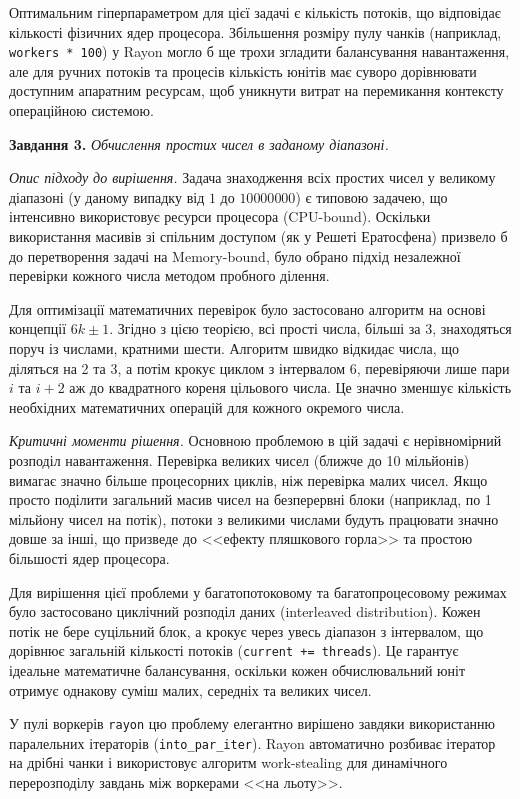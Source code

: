 \documentclass[14pt, a4paper]{extreport}
\begin{document}
	Оптимальним гіперпараметром для цієї задачі є кількість потоків, що відповідає кількості фізичних ядер процесора. Збільшення розміру пулу чанків (наприклад, \texttt{workers * 100}) у Rayon могло б ще трохи згладити балансування навантаження, але для ручних потоків та процесів кількість юнітів має суворо дорівнювати доступним апаратним ресурсам, щоб уникнути витрат на перемикання контексту операційною системою.
	
	\textbf{Завдання 3.} \textit{Обчислення простих чисел в заданому діапазоні.}
	
	\textit{Опис підходу до вирішення.}
	Задача знаходження всіх простих чисел у великому діапазоні (у даному випадку від $1$ до $10 000 000$) є типовою задачею, що інтенсивно використовує ресурси процесора (CPU-bound). Оскільки використання масивів зі спільним доступом (як у Решеті Ератосфена) призвело б до перетворення задачі на Memory-bound, було обрано підхід незалежної перевірки кожного числа методом пробного ділення. 
	
	Для оптимізації математичних перевірок було застосовано алгоритм на основі концепції $6k \pm 1$. Згідно з цією теорією, всі прості числа, більші за 3, знаходяться поруч із числами, кратними шести. Алгоритм швидко відкидає числа, що діляться на 2 та 3, а потім крокує циклом з інтервалом 6, перевіряючи лише пари $i$ та $i+2$ аж до квадратного кореня цільового числа. Це значно зменшує кількість необхідних математичних операцій для кожного окремого числа. 
	
	\textit{Критичні моменти рішення.}
	Основною проблемою в цій задачі є нерівномірний розподіл навантаження. Перевірка великих чисел (ближче до 10 мільйонів) вимагає значно більше процесорних циклів, ніж перевірка малих чисел. Якщо просто поділити загальний масив чисел на безперервні блоки (наприклад, по 1 мільйону чисел на потік), потоки з великими числами будуть працювати значно довше за інші, що призведе до <<ефекту пляшкового горла>> та простою більшості ядер процесора.
	
	Для вирішення цієї проблеми у багатопотоковому та багатопроцесовому режимах було застосовано циклічний розподіл даних (interleaved distribution). Кожен потік не бере суцільний блок, а крокує через увесь діапазон з інтервалом, що дорівнює загальній кількості потоків (\texttt{current += threads}). Це гарантує ідеальне математичне балансування, оскільки кожен обчислювальний юніт отримує однакову суміш малих, середніх та великих чисел.
	
	У пулі воркерів \texttt{rayon} цю проблему елегантно вирішено завдяки використанню паралельних ітераторів (\texttt{into\_par\_iter}). Rayon автоматично розбиває ітератор на дрібні чанки і використовує алгоритм work-stealing для динамічного перерозподілу завдань між воркерами <<на льоту>>.
	
\end{document}
